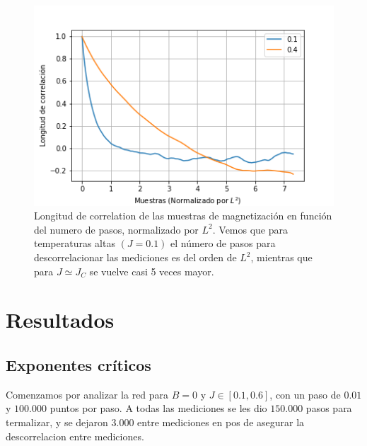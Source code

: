 \documentclass[
 reprint,
 amsmath,amssymb,
 aps,
]{revtex4-1}
\begin{document}
\begin{figure}
  \includegraphics[width=1.0\columnwidth]{images/correlation.png}
  \caption{Longitud de correlation de las muestras de magnetizaci\'on en
    funci\'on del numero de pasos, normalizado por $L^2$. Vemos que para
    temperaturas altas $(J = 0.1)$ el n\'umero de pasos para descorrelacionar
    las mediciones es del orden de $L^2$, mientras que para $J \simeq J_C$ se
    vuelve casi 5 veces mayor.}
  \label{correlation}
\end{figure}

\section{Resultados}

\subsection{Exponentes cr\'iticos}

Comenzamos por analizar la red para $B = 0$ y $J\in[0.1, 0.6]$,
con un paso de $0.01$ y $100.000$ puntos por paso. A todas las mediciones se les
dio $150.000$ pasos para termalizar, y se dejaron $3.000$ entre mediciones en pos
de asegurar la descorrelacion entre mediciones.
\end{document}
